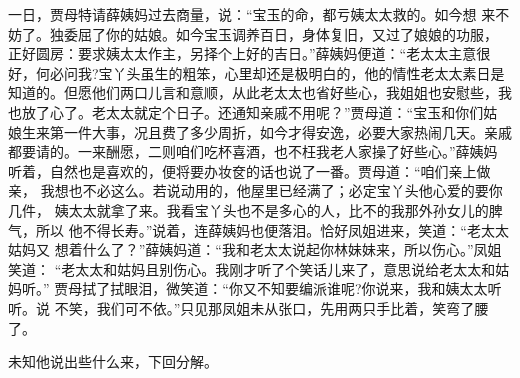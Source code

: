 一日，贾母特请薛姨妈过去商量，说：“宝玉的命，都亏姨太太救的。如今想
来不妨了。独委屈了你的姑娘。如今宝玉调养百日，身体复旧，又过了娘娘的功服，
正好圆房：要求姨太太作主，另择个上好的吉日。”薛姨妈便道：“老太太主意很
好，何必问我?宝丫头虽生的粗笨，心里却还是极明白的，他的情性老太太素日是
知道的。但愿他们两口儿言和意顺，从此老太太也省好些心，我姐姐也安慰些，我
也放了心了。老太太就定个日子。还通知亲戚不用呢？”贾母道：“宝玉和你们姑
娘生来第一件大事，况且费了多少周折，如今才得安逸，必要大家热闹几天。亲戚
都要请的。一来酬愿，二则咱们吃杯喜酒，也不枉我老人家操了好些心。”薛姨妈
听着，自然也是喜欢的，便将要办妆奁的话也说了一番。贾母道：“咱们亲上做亲，
我想也不必这么。若说动用的，他屋里已经满了；必定宝丫头他心爱的要你几件，
姨太太就拿了来。我看宝丫头也不是多心的人，比不的我那外孙女儿的脾气，所以
他不得长寿。”说着，连薛姨妈也便落泪。恰好凤姐进来，笑道：“老太太姑妈又
想着什么了？”薛姨妈道：“我和老太太说起你林妹妹来，所以伤心。”凤姐笑道：
“老太太和姑妈且别伤心。我刚才听了个笑话儿来了，意思说给老太太和姑妈听。”
贾母拭了拭眼泪，微笑道：“你又不知要编派谁呢?你说来，我和姨太太听听。说
不笑，我们可不依。”只见那凤姐未从张口，先用两只手比着，笑弯了腰了。

未知他说出些什么来，下回分解。